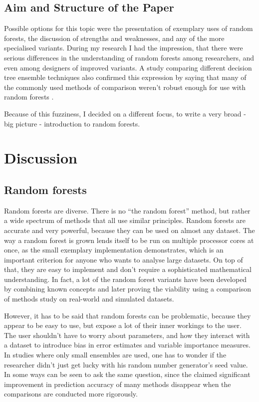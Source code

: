\documentclass[a4paper,man,12pt,apacite,floatsintext,draftfirst]{apa6} %
\begin{document}
\subsection{Aim and Structure of the Paper}
Possible options for this topic were the presentation of
exemplary uses of random
forests, the discussion of strengths and weaknesses, and any of the more
specialised variants.
During my research I had the impression, that there were serious
differences in the understanding of random forests among researchers,
and even among designers of improved variants.
A study comparing different decision tree ensemble techniques also confirmed
this expression by saying that many of the commonly used methods of comparison
weren't robust enough for use with random forests \cite{banfield2007comparison}.

Because of this fuzziness, I decided on a different focus, to write
a very broad - big picture - introduction to random forests.

\newpage
\section{Discussion}
\subsection{Random forests}
Random forests are diverse.
There is no “the random forest” method, but rather a wide spectrum of
methods that all use similar principles.
Random forests are accurate and very powerful, because they can be used
on almost any dataset.
The way a random forest is grown lends itself to be run on multiple processor 
cores at once, as the
small exemplary implementation demonstrates, which is an important criterion
for anyone who wants to analyse large datasets.
On top of that, they are easy to implement and don't require a sophisticated
mathematical understanding.
In fact, a lot of the random forest variants have been developed by combining
known concepts and later proving the viability using  a comparison of methods
study on real-world and simulated datasets.

However, it has to be said that random forests can be problematic,
because they appear to be easy to use, but expose a lot of their
inner workings to the user.
The user shouldn't have to worry about parameters, and how they interact
with a dataset to introduce bias in error estimates and
variable importance measures.
In studies where only small ensembles are used, one has to wonder if the
researcher didn't just get lucky with his random number generator's seed value.
In some ways  can be seen to ask the same question,
since the claimed significant improvement in prediction accuracy of many methods
disappear when the comparisons are conducted more rigorously.
\end{document}
